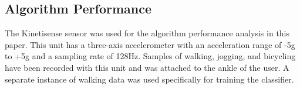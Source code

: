 \documentclass[conference]{IEEEtran}
\begin{document}
\subsection{Algorithm Performance}
%
The Kinetisense sensor was used for the algorithm performance analysis in this paper.
This unit has a three-axis accelerometer with an acceleration range of -5g to +5g and a sampling rate of 128Hz.
Samples of walking, jogging, and bicycling have been recorded with this unit and was attached to the ankle of the user.
A separate instance of walking data was used specifically for training the classifier.
%
\begin{figure}[!ht]
  \centering
  \quad
  \centering
  \centering
  \quad

\end{figure}
\end{document}
